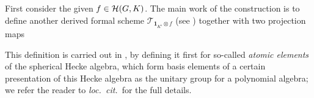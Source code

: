 First consider the given $f \in \mathcal H(G, K)$.
The main work of the construction is to define another
derived formal scheme $\mathcal{T}_{\mathbf{1}_{K^\flat} \otimes f}$
(see \cite[\S6.1]{ref:AFLspherical}) together with two projection maps
\begin{center}
\end{center}
This definition is carried out in \cite[\S5]{ref:AFLspherical},
by defining it first for so-called \emph{atomic elements} of the spherical Hecke algebra,
which form basis elements of a certain presentation of this Hecke algebra
as the unitary group for a polynomial algebra;
we refer the reader to \emph{loc.\ cit.}~for the full details.

